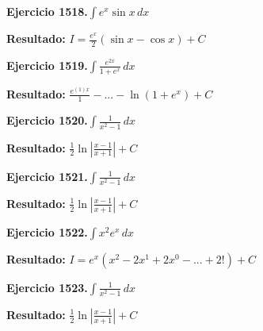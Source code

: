 \documentclass[10pt,a4paper]{article}
\begin{document}
\begin{ejbox}
\textbf{Ejercicio 1518.}\quad $\int e^x\sin x\,dx$
\end{ejbox}

\begin{solbox}
\textbf{Resultado:} \(\displaystyle I = \frac{e^x}{2}(\sin x - \cos x) + C\)
\end{solbox}

\newpage
\begin{ejbox}
\textbf{Ejercicio 1519.}\quad $\int \frac{e^{2x}}{1+e^{x}}\,dx$
\end{ejbox}

\begin{solbox}
\textbf{Resultado:} \(\displaystyle \frac{e^{(1)x}}{1} - ... - \ln(1+e^x) + C\)
\end{solbox}

\begin{ejbox}
\textbf{Ejercicio 1520.}\quad $\int \frac{1}{x^2-1}\,dx$
\end{ejbox}

\begin{solbox}
\textbf{Resultado:} \(\displaystyle \frac{1}{2}\ln\left|\frac{x-1}{x+1}\right| + C\)
\end{solbox}

\begin{ejbox}
\textbf{Ejercicio 1521.}\quad $\int \frac{1}{x^2-1}\,dx$
\end{ejbox}

\begin{solbox}
\textbf{Resultado:} \(\displaystyle \frac{1}{2}\ln\left|\frac{x-1}{x+1}\right| + C\)
\end{solbox}

\newpage
\begin{ejbox}
\textbf{Ejercicio 1522.}\quad $\int x^{2} e^x\,dx$
\end{ejbox}

\begin{solbox}
\textbf{Resultado:} \(\displaystyle I = e^x(x^{2} - 2x^{1} + 2x^{0} - ... + 2!) + C\)
\end{solbox}

\begin{ejbox}
\textbf{Ejercicio 1523.}\quad $\int \frac{1}{x^2-1}\,dx$
\end{ejbox}

\begin{solbox}
\textbf{Resultado:} \(\displaystyle \frac{1}{2}\ln\left|\frac{x-1}{x+1}\right| + C\)
\end{solbox}
\end{document}
